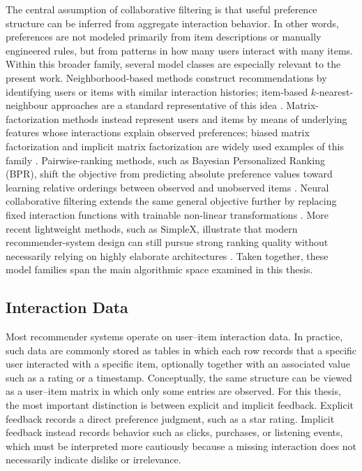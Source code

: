 \documentclass[12pt,a4paper]{article}
\begin{document}
The central assumption of collaborative filtering is that useful preference structure can be inferred from aggregate interaction behavior. In other words, preferences are not modeled primarily from item descriptions or manually engineered rules, but from patterns in how many users interact with many items. Within this broader family, several model classes are especially relevant to the present work. Neighborhood-based methods construct recommendations by identifying users or items with similar interaction histories; item-based $k$-nearest-neighbour approaches are a standard representative of this idea \cite{itemknn}. Matrix-factorization methods instead represent users and items by means of underlying features whose interactions explain observed preferences; biased matrix factorization and implicit matrix factorization are widely used examples of this family \cite{biasedmf,implicitmf}. Pairwise-ranking methods, such as Bayesian Personalized Ranking (BPR), shift the objective from predicting absolute preference values toward learning relative orderings between observed and unobserved items \cite{bpr}. Neural collaborative filtering extends the same general objective further by replacing fixed interaction functions with trainable non-linear transformations \cite{neumf}. More recent lightweight methods, such as SimpleX, illustrate that modern recommender-system design can still pursue strong ranking quality without necessarily relying on highly elaborate architectures \cite{simplex}. Taken together, these model families span the main algorithmic space examined in this thesis.

\subsection{Interaction Data}
Most recommender systems operate on user--item interaction data. In practice, such data are commonly stored as tables in which each row records that a specific user interacted with a specific item, optionally together with an associated value such as a rating or a timestamp. Conceptually, the same structure can be viewed as a user--item matrix in which only some entries are observed. For this thesis, the most important distinction is between explicit and implicit feedback. Explicit feedback records a direct preference judgment, such as a star rating. Implicit feedback instead records behavior such as clicks, purchases, or listening events, which must be interpreted more cautiously because a missing interaction does not necessarily indicate dislike or irrelevance.
\end{document}
